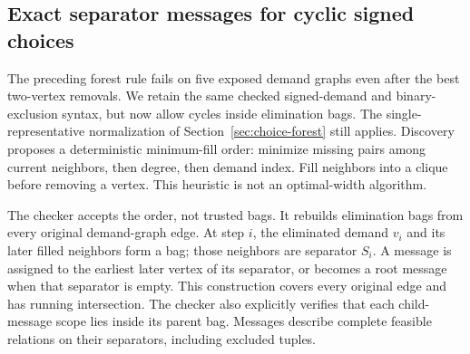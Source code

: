 \subsection{Exact separator messages for cyclic signed choices}
\label{sec:choice-separator}

The preceding forest rule fails on five exposed demand graphs even after the best
two-vertex removals. We retain the same checked signed-demand and binary-exclusion
syntax, but now allow cycles inside elimination bags. The single-representative
normalization of Section~\ref{sec:choice-forest} still applies. Discovery proposes
a deterministic minimum-fill order: minimize missing pairs among current
neighbors, then degree, then demand index. Fill neighbors into a clique before
removing a vertex. This heuristic is not an optimal-width algorithm.

The checker accepts the order, not trusted bags. It rebuilds elimination bags
from every original demand-graph edge. At step $i$, the eliminated demand $v_i$
and its later filled neighbors form a bag; those neighbors are separator $S_i$.
A message is assigned to the earliest later vertex of its separator, or becomes
a root message when that separator is empty. This construction covers every
original edge and has running intersection. The checker also explicitly verifies
that each child-message scope lies inside its parent bag. Messages describe
complete feasible relations on their separators, including excluded tuples.

